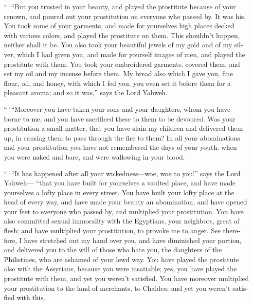 \begin{paracol}{2}
\begin{otherlanguage}{english}
 ``\,`\,``But you trusted in your beauty, and played the
prostitute because of your renown, and poured out your prostitution on
everyone who passed by. It was his.  You took some of
your garments, and made for yourselves high places decked with various
colors, and played the prostitute on them. This shouldn't happen,
neither shall it be.  You also took your beautiful jewels
of my gold and of my silver, which I had given you, and made for
yourself images of men, and played the prostitute with them.
 You took your embroidered garments, covered them, and
set my oil and my incense before them.  My bread also
which I gave you, fine flour, oil, and honey, with which I fed you, you
even set it before them for a pleasant aroma; and so it was,'' says the
Lord Yahweh.

 ``\,`\,``Moreover you have taken your sons and your
daughters, whom you have borne to me, and you have sacrificed these to
them to be devoured. Was your prostitution a small matter,
 that you have slain my children and delivered them up,
in causing them to pass through the fire to them?  In all
your abominations and your prostitution you have not remembered the days
of your youth, when you were naked and bare, and were wallowing in your
blood.

 ``\,`\,``It has happened after all your
wickedness---woe, woe to you!'' says the Lord Yahweh--- 
``that you have built for yourselves a vaulted place, and have made
yourselves a lofty place in every street.  You have built
your lofty place at the head of every way, and have made your beauty an
abomination, and have opened your feet to everyone who passed by, and
multiplied your prostitution.  You have also committed
sexual immorality with the Egyptians, your neighbors, great of flesh;
and have multiplied your prostitution, to provoke me to anger.
 See therefore, I have stretched out my hand over you,
and have diminished your portion, and delivered you to the will of those
who hate you, the daughters of the Philistines, who are ashamed of your
lewd way.  You have played the prostitute also with the
Assyrians, because you were insatiable; yes, you have played the
prostitute with them, and yet you weren't satisfied.  You
have moreover multiplied your prostitution to the land of merchants, to
Chaldea; and yet you weren't satisfied with this.


\end{otherlanguage}
\end{paracol}

